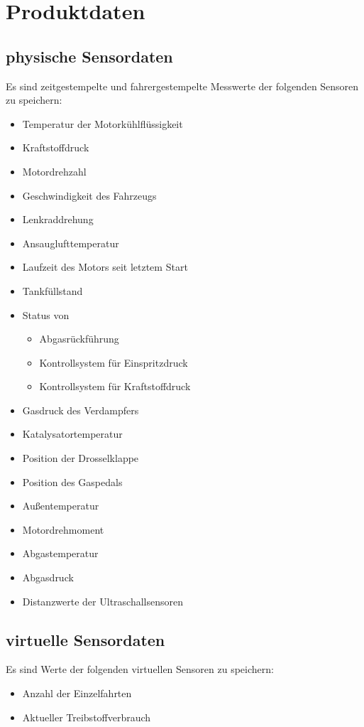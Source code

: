 \documentclass[pflichtenheft.tex]{subfiles}
\begin{document}
\chapter{Produktdaten}

\section{\mkd physische Sensordaten}
Es sind zeitgestempelte und fahrergestempelte Messwerte der folgenden Sensoren zu speichern:
\begin{itemize}
\item
Temperatur der Motorkühlflüssigkeit
\item
Kraftstoffdruck
\item
Motordrehzahl
\item
Geschwindigkeit des Fahrzeugs
\item
Lenkraddrehung
\item
Ansauglufttemperatur 
\item
Laufzeit des Motors seit letztem Start
\item
Tankfüllstand
\item
Status von
\begin{itemize}
\item Abgasrückführung
\item Kontrollsystem für Einspritzdruck
\item Kontrollsystem für Kraftstoffdruck
\end{itemize}
\item
Gasdruck des Verdampfers
\item
Katalysatortemperatur
\item
Position der Drosselklappe
\item
Position des Gaspedals
\item
Außentemperatur
\item
Motordrehmoment
\item
Abgastemperatur
\item
Abgasdruck
\item
Distanzwerte der Ultraschallsensoren

\end{itemize}

\section{\mkd virtuelle Sensordaten}
Es sind Werte der folgenden virtuellen Sensoren zu speichern:
\begin{itemize}
\item Anzahl der Einzelfahrten
\item Aktueller Treibstoffverbrauch


\end{itemize}
\end{document}
